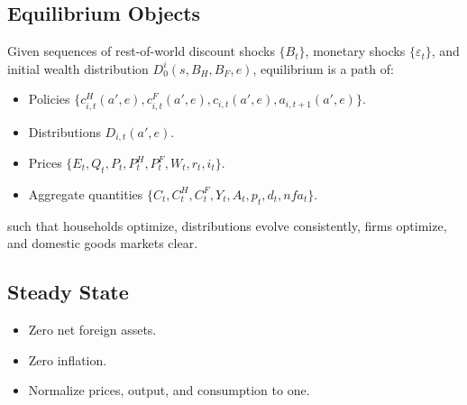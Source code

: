\documentclass[12pt]{article}
\begin{document}
\subsection{Equilibrium Objects}
Given sequences of rest-of-world discount shocks $\{B_t\}$, monetary shocks $\{\varepsilon_t\}$, and initial wealth distribution $D^i_0(s,B_H,B_F,e)$, equilibrium is a path of:
\begin{itemize}
  \item Policies $\{c^H_{i,t}(a',e), c^F_{i,t}(a',e), c_{i,t}(a',e), a_{i,t+1}(a',e)\}$.
  \item Distributions $D_{i,t}(a',e)$.
  \item Prices $\{E_t,Q_t,P_t,P^H_t,P^F_t,W_t,r_t,i_t\}$.
  \item Aggregate quantities $\{C_t,C^H_t,C^F_t,Y_t,A_t,p_t,d_t,nfa_t\}$.
\end{itemize}
such that households optimize, distributions evolve consistently, firms optimize, and domestic goods markets clear.

\subsection{Steady State}
\begin{itemize}
  \item Zero net foreign assets.
  \item Zero inflation.
  \item Normalize prices, output, and consumption to one.
\end{itemize}
\end{document}
